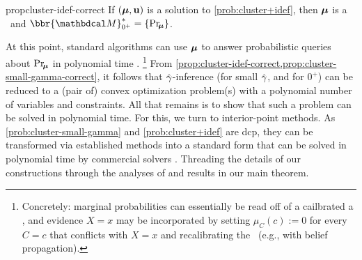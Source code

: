 \begin{linked}{prop}{cluster-idef-correct}
    If $(\boldsymbol\mu, \mathbf u)$ is a solution to \eqref{prob:cluster+idef},
    then $\boldsymbol\mu$ is a \cactree\
    and $\bbr{\dg M}^*_{0^+} = \{ \Pr_{\!\bmu} \}$.
\end{linked}



At this point, standard algorithms can use $\boldsymbol\mu$
to answer probabilistic queries about $\Pr_{\!\boldsymbol\mu}$ in polynomial time \parencite[\S 10.3.3]{koller2009probabilistic}.
\unskip\footnote{%
    Concretely: marginal probabilities can essentially be read off of a cailbrated a \actree,
    and evidence $X{=}x$ may be incorporated by
    setting $\mu_C(c) := 0$ for every $C{=}c$ that conflicts with $X{=}x$
    and recalibrating the \actree\ (e.g., with belief propagation). }
From \cref{prop:cluster-idef-correct,prop:cluster-small-gamma-correct}, it follows that
$\zogamma$-inference
(for small $\zogamma$, and for $0^+$)
can be reduced to a (pair of) convex optimization problem(s) with
a polynomial number of variables and constraints.
All that remains 
is to show that such a problem can be solved in polynomial time.
For this, we turn to interior-point methods.
As
\eqref{prob:cluster-small-gamma} and \eqref{prob:cluster+idef} are dcp, they
can be transformed via established methods \parencite{agrawal2018rewriting} into
a standard form
that can be solved in polynomial time by commercial solvers \parencite{mosek,ECOS}.
Threading the details of our constructions through
the analyses of \textcite{dahl2022primal}
and \textcite{nesterov1996infeasible}
results in
our main theorem.


